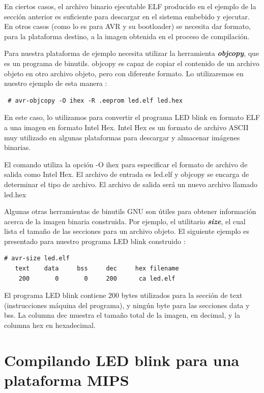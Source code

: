 \documentclass[output=paper, 
colorlinks,
citecolor=brown,
newtxmath
]{langscibook}
\begin{document}
En ciertos casos, el archivo binario ejecutable ELF producido en el 
ejemplo de la sección anterior es suficiente para descargar en el sistema 
embebido y ejecutar. En otros casos (como lo es para AVR
y su bootloader) se necesita dar formato, para la plataforma destino,
 a la imagen obtenida
en el proceso de compilación. 

Para nuestra plataforma de ejemplo necesita utilizar la herramienta
\textit{\textbf{objcopy}}, que es un programa de binutils.
objcopy es capaz de copiar el contenido de un archivo objeto en otro 
archivo objeto, pero con diferente formato.
Lo utilizaremos en nuestro ejemplo de esta manera :

\begin{verbatim}
 # avr-objcopy -O ihex -R .eeprom led.elf led.hex
\end{verbatim}

En este caso, lo utilizamos para convertir el programa LED blink
en formato ELF a una imagen en formato Intel Hex. Intel Hex 
es un formato de archivo ASCII muy utilizado en algunas plataformas
para descargar y almacenar imágenes binarias.

El comando utiliza la opción -O ihex para especificar el formato 
de archivo de salida como Intel Hex. El archivo de entrada es led.elf
y objcopy se encarga de determinar el tipo de archivo. El archivo de salida
será un nuevo archivo llamado led.hex

Algunas otras herramientas de binutils GNU son útiles para obtener 
información acerca de la imagen binaria construida.
Por ejemplo, el utilitario \textit{\textbf{size}}, el cual lista el tamaño de las secciones
para un archivo objeto. El siguiente ejemplo es presentado
para nuestro programa LED blink construido :

\begin{verbatim}
# avr-size led.elf
   text	   data	    bss	    dec	    hex	filename
    200	      0	      0	    200	     ca	led.elf
\end{verbatim}

El programa LED blink contiene 200 bytes utilizados para la sección de text 
(instrucciones máquina del programa), y
ningún byte para las secciones data y bss. La columna dec muestra el tamaño
total de la imagen, en decimal, y la columna hex en hexadecimal.


\section {Compilando LED blink para una plataforma MIPS}
\end{document}
